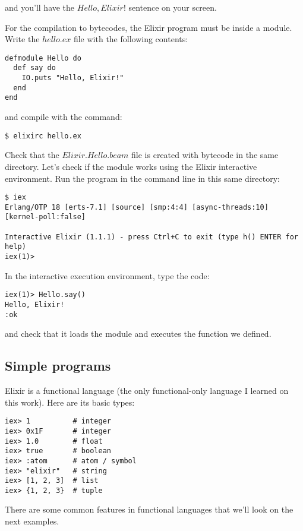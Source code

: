 and you'll have the $Hello, Elixir!$ sentence on your screen.

For the compilation to bytecodes, the Elixir program must be inside a module.
Write the $hello.ex$ file with the following contents:

\begin{lstlisting}[label=emhw,caption=Elixir Hello World inside a module]
defmodule Hello do
  def say do
    IO.puts "Hello, Elixir!"
  end
end
\end{lstlisting}

and compile with the command:

\begin{verbatim}
$ elixirc hello.ex
\end{verbatim}

Check that the $Elixir.Hello.beam$ file is created with bytecode in the same
directory. Let's check if the module works using the Elixir interactive
environment. Run the program in the command line in this same directory:

\begin{verbatim}
$ iex
Erlang/OTP 18 [erts-7.1] [source] [smp:4:4] [async-threads:10] [kernel-poll:false]

Interactive Elixir (1.1.1) - press Ctrl+C to exit (type h() ENTER for help)
iex(1)>
\end{verbatim}

In the interactive execution environment, type the code:

\begin{verbatim}
iex(1)> Hello.say()
Hello, Elixir!
:ok
\end{verbatim}

and check that it loads the module and executes the function we defined.

\subsection{Simple programs}

Elixir is a functional language (the only functional-only language I learned on
this work). Here are its basic types:

\begin{verbatim}
iex> 1          # integer
iex> 0x1F       # integer
iex> 1.0        # float
iex> true       # boolean
iex> :atom      # atom / symbol
iex> "elixir"   # string
iex> [1, 2, 3]  # list
iex> {1, 2, 3}  # tuple
\end{verbatim}

There are some common features in functional languages that we'll
look on the next examples.

